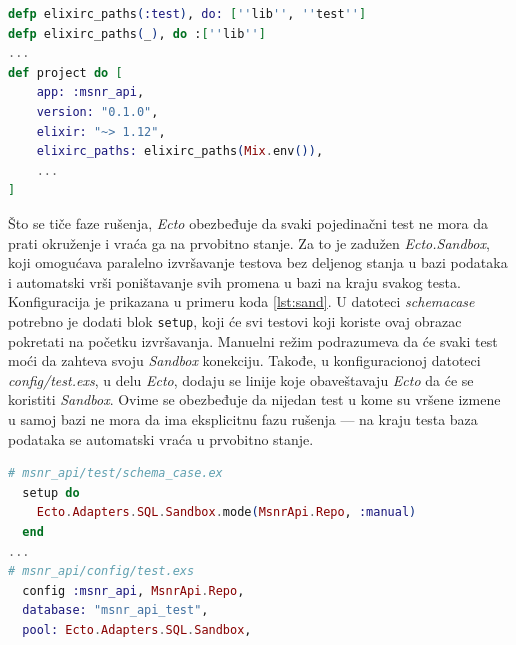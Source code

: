 \documentclass[12pt,oneside]{memoir}
\begin{document}
\begin{minipage}{\linewidth}
\begin{lstlisting}[language=elixir, basicstyle=\small, caption={Uključivanje datoteka iz direktorijuma \textit{test} pri kompilaciji u testnom okruženju},captionpos=b, label={lst:mst}]
defp elixirc_paths(:test), do: [''lib'', ''test'']
defp elixirc_paths(_), do :[''lib'']
...
def project do [
    app: :msnr_api,
    version: "0.1.0",
    elixir: "~> 1.12",
    elixirc_paths: elixirc_paths(Mix.env()), 
    ...
]
\end{lstlisting}
\end{minipage}

\par Što se tiče faze rušenja, \emph{Ecto} obezbeđuje da svaki pojedinačni test ne mora da prati okruženje i vraća ga na prvobitno stanje. Za to je zadužen \emph{Ecto.Sandbox}, koji omogućava paralelno izvršavanje testova bez deljenog stanja u bazi podataka i automatski vrši poništavanje svih promena u bazi na kraju svakog testa. Konfiguracija je prikazana u primeru koda \ref{lst:sand}. U datoteci \emph{schema{\textunderscore}case} potrebno je dodati blok \texttt{setup}, koji će svi testovi koji koriste ovaj obrazac pokretati na početku izvršavanja. Manuelni režim podrazumeva da će svaki test moći da zahteva svoju \emph{Sandbox} konekciju. Takođe, u konfiguracionoj datoteci \emph{config/test.exs}, u delu \emph{Ecto}, dodaju se linije koje obaveštavaju \emph{Ecto} da će se koristiti \emph{Sandbox}. Ovime se obezbeđuje da nijedan test u kome su vršene izmene u samoj bazi ne mora da ima eksplicitnu fazu rušenja --- na kraju testa baza podataka se automatski vraća u prvobitno stanje. \\ 


\begin{minipage}{\linewidth}
\begin{lstlisting}[language=elixir, basicstyle=\small, caption={Podešavanje \emph{Ecto.Sandbox}},captionpos=b, label={lst:sand}]
# msnr_api/test/schema_case.ex
  setup do
    Ecto.Adapters.SQL.Sandbox.mode(MsnrApi.Repo, :manual)
  end
...
# msnr_api/config/test.exs
  config :msnr_api, MsnrApi.Repo,
  database: "msnr_api_test",
  pool: Ecto.Adapters.SQL.Sandbox,
\end{lstlisting}
\end{minipage}
\end{document}
